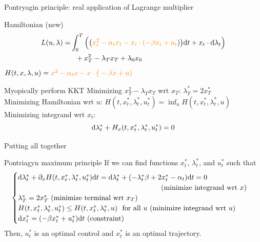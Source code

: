 \documentclass[color=usenames,dvipsnames]{beamer}
\newcommand{\dd}{\text{\normalfont d}}
\newcommand{\dt}{\text{\normalfont d}t}
\newcommand{\dx}{\text{\normalfont d}x}
\begin{document}
\begin{frame}{Pontryagin principle: real application of Lagrange multiplier}
    \begin{block}
        {Hamiltonian (new)}
        \[
        \begin{split}
        L(u,\lambda)=& \int_0^T\Big(\big({\color{orange}x_t^2 - \alpha_t x_t -x_t\cdot(-\beta x_t + u_t})\big)\dt + x_t\cdot{\dd}\lambda_t  \Big) \\
        &~~+ x_T^2- \lambda_Tx_T +\lambda_0 x_0
        \end{split}\]
        $H(t,x,\lambda,u)={\color{orange}x^2 - \alpha_t x -x\cdot\big(-\beta x + u)}$
    \end{block}
    \begin{block}
        {Myopically perform KKT}
        Minimizing $x_T^2- \lambda_Tx_T$ wrt $x_T$: $\lambda^*_T=2x^*_T$\\
        Minimizing Hamiltonian wrt $u$: $H(t,x^*_t,\lambda^*_t,u^*_t)=\inf_{u}H(t,x^*_t,\lambda^*_t,u)$
        Minimizing integrand wrt $x_t$: 
        \[
        \dd\lambda^*_t + H_x(t,x^*_t,\lambda^*_t,u^*_t)=0
        \]
    \end{block}
\end{frame}
\begin{frame}{Putting all together}
    \begin{block}
        {Pontriagyn maximum principle}
        If we can find functions $x^*_t$, $\lambda^*_t$, and $u^*_t$ such that 
    \[
    \begin{cases}
        {\dd}\lambda^*_t+ \partial_x H(t,x^*_t,\lambda^*_t,u^*_t){{\dt}}={\dd}\lambda^*_t+ (-\lambda^*_t \beta  +2x^*_t -\alpha_t){{\dt}}=0\\
        \hspace{7cm}(\textrm{minimize integrand wrt $x$})\\
        \lambda^*_T=2x_T^* ~(\textrm{minimize terminal wrt $x_T$})\\
        H(t,x^*_t,\lambda^*_t,u^*_t)\le H(t,x^*_t,\lambda^*_t,u)~\textrm{ for all } u ~(\textrm{minimize integrand wrt $u$})\\
        {\dx}^*_t = (-\beta x^*_t + u^*_t) {{\dt}} ~(\textrm{constraint})
        \end{cases}
    \]
    Then, $u^*_t$ is an optimal control and $x^*_t$ is an optimal trajectory.
    \end{block}
\end{frame}
\end{document}
